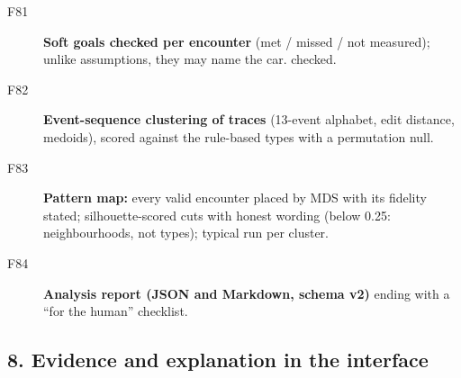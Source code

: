 \begin{description}
\item[F81] \textbf{Soft goals checked per encounter} (met / missed / not measured); unlike assumptions, they may name the car.  \tagnew{} checked.
\item[F82] \textbf{Event-sequence clustering of traces} (13-event alphabet, edit distance, medoids), scored against the rule-based types with a permutation null. \tagnew{} 
\item[F83] \textbf{Pattern map:} every valid encounter placed by MDS with its fidelity stated; silhouette-scored cuts with honest wording (below 0.25: neighbourhoods, not types); typical run per cluster. \tagnew{} 
\item[F84] \textbf{Analysis report (JSON and Markdown, schema v2)} ending with a ``for the human'' checklist. \tagnew{}
\end{description}

\subsection*{8. Evidence and explanation in the interface}

